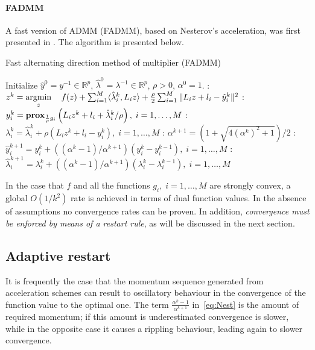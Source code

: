 \documentclass[openany]{now}
\newcommand{\reals}{{\mathbb R}}
\newcommand{\argmin}{\mathop{\rm argmin}}
\newcommand{\prox}{\mathop{\bf prox}}
\begin{document}
\paragraph*{FADMM} A fast version of ADMM (FADMM), based on Nesterov's acceleration, was first presented in \cite{goldstein2014fast}. The algorithm is presented below.
\begin{algorithm}
\caption{Fast alternating direction method of multiplier (FADMM)}
\label{al:FADMM}
\begin{algorithmic} 
\REQUIRE Initialize $\hat{y}^{0} = y^{-1} \in \reals^{p}$, $ \hat{\lambda}^{0} = \lambda^{-1}\in \reals^{p}$, $\rho > 0$, $\alpha^{0} = 1$.
\LOOP
{}: $z^{k} = \argmin\limits_{z} \quad f(z) + \sum_{i=1}^M \langle  \hat{\lambda}_i^k, L_i z\rangle  + \frac{\rho}{2}\sum_{i=1}^M\|L_i z+l_i-\hat{y}_i^k\|^{2}$
: $y_i^{k} = \prox_{\frac{1}{\rho}g_i}\left(L_iz^k+l_i+\hat{\lambda}_i^k/\rho\right), \; i=1,\ldots,M$
: $\lambda^{k}_i = \hat{\lambda}_i^k + \rho(L_i z^{k} + l_i - y_i^{k}),\; i=1,\ldots,M$
: $\alpha^{k+1} = \left(1+\sqrt{4(\alpha^{k})^{2}+1}\right)/2$
: $\hat{y}_i^{k+1} = y_i^k + ((\alpha^k-1)/\alpha^{k+1})(y_i^k-y_i^{k-1}),\; i=1,\ldots,M$
: $\hat{\lambda}_i^{k+1} = \lambda_i^k + ((\alpha^k-1)/\alpha^{k+1})(\lambda_i^k-\lambda_i^{k-1}),\; i=1,\ldots,M$
\ENDLOOP
\end{algorithmic}
\end{algorithm}\begin{footnotesize}
\end{footnotesize}
In the case that $f$ and all the functions $g_i, \; i=1,\ldots,M$ are strongly convex, a global $O(1/k^2)$ rate is achieved in terms of dual function values.
In the absence of assumptions no convergence rates can be proven. In addition, \emph{convergence must be enforced by means of a restart rule}, as will be discussed in the next section. 


\subsection{Adaptive restart}
It is frequently the case that the momentum sequence generated from acceleration schemes can result to oscillatory behaviour in the convergence of the function value to the optimal one. The term $\frac{\alpha^{k}-1}{\alpha^{k+1}}$ in~\eqref{eq:Nest} is the amount of required momentum; if this amount is underestimated convergence is slower, while in the opposite case it causes a rippling behaviour, leading again to slower convergence.
\end{document}
